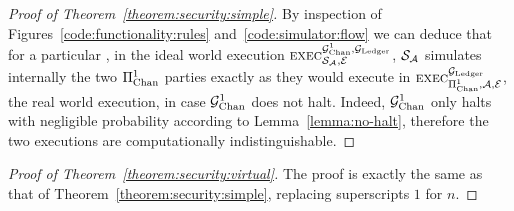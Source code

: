 \begin{proof}[Proof of Theorem~\ref{theorem:security:simple}]
  By inspection of Figures~\ref{code:functionality:rules}
  and~\ref{code:simulator:flow} we can deduce that for a particular
  \environment, in the ideal world execution $\textsc{exec}^{\mathcal{G}_{\mathrm{Chan}}^{1},
  \mathcal{G}_{\mathrm{Ledger}}}_{\mathcal{S}_{\mathcal{A}}, \mathcal{E}}$, $\mathcal{S}_{\mathcal{A}}$
  simulates internally the two $\Pi_{\mathrm{Chan}}^{1}$ parties exactly as they would execute in
  $\textsc{exec}^{\mathcal{G}_{\mathrm{Ledger}}}_{\Pi_{\mathrm{Chan}}^{1}, \mathcal{A}, \mathcal{E}}$, the real world
  execution, in case $\mathcal{G}_{\mathrm{Chan}}^{1}$ does not halt. Indeed, $\mathcal{G}_{\mathrm{Chan}}^{1}$ only halts with
  negligible probability according to Lemma~\ref{lemma:no-halt}, therefore the
  two executions are computationally indistinguishable.
\end{proof}

\begin{proof}[Proof of Theorem~\ref{theorem:security:virtual}]
  The proof is exactly the same as that of
  Theorem~\ref{theorem:security:simple}, replacing superscripts $1$ for $n$.
\end{proof}
